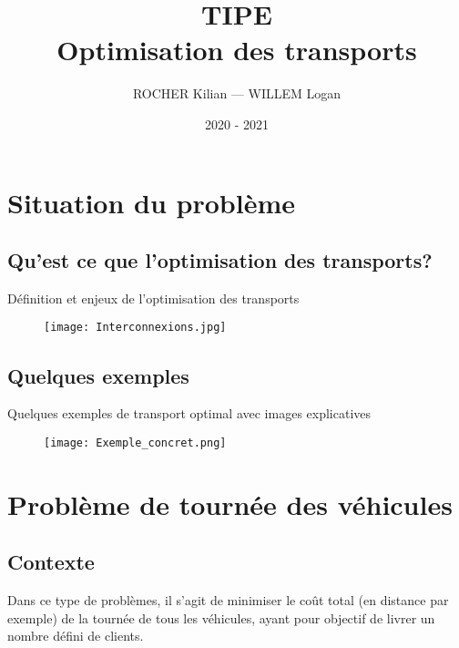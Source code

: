 \documentclass[10pt]{beamer}
\title[TIPE — Optimisation des transports]{TIPE \\ Optimisation des transports}
\author{ROCHER Kilian — WILLEM Logan}
\date{2020 - 2021}
\begin{document}
	\begin{frame}[plain]
		\maketitle
	\end{frame}

	\begin{frame}[plain]
		\tableofcontents
	\end{frame}

	\section{Situation du problème}
	
	\subsection{Qu'est ce que l'optimisation des transports?}
	
	\begin{frame}
		 Définition et enjeux de l'optimisation des transports
		 \begin{figure}
		    \texttt{[image: Interconnexions.jpg]}
		 \end{figure}
	\end{frame}
	
	\subsection{Quelques exemples}
	
	\begin{frame}
		Quelques exemples de transport optimal avec images explicatives
		\begin{figure}
		   \texttt{[image: Exemple\_concret.png]}
		\end{figure}
	\end{frame}
	
	\section{Problème de tournée des véhicules}
	
	\subsection{Contexte}
	
	\begin{frame}
		Dans ce type de problèmes, il s'agit de minimiser le coût total (en distance par exemple) de la tournée de tous les véhicules, ayant pour objectif de livrer un nombre défini de clients.
	\end{frame}
\end{document}

